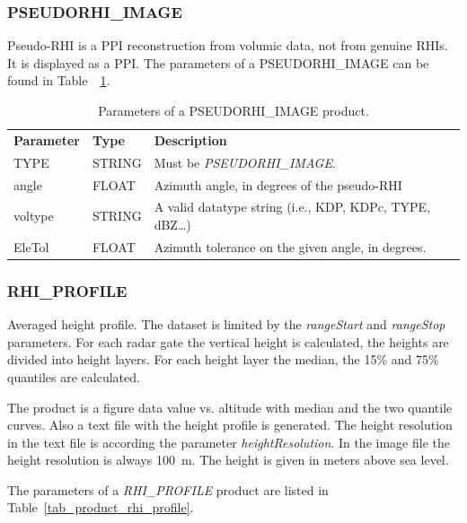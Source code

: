 \documentclass[a4paper,11pt,pdftex,twoside]{scrartcl}
\renewcommand{\bf}{\normalfont \bfseries}
\begin{document}
{{{\subsubsection{PSEUDORHI\_IMAGE}
    \label{subsec_pseudorhi_image}
Pseudo-RHI is a PPI reconstruction from volumic data, not from genuine RHIs.
It is displayed as a PPI. The parameters of a PSEUDORHI\_IMAGE can be found in Table~~\ref{tab_product_pseudorhi_image}.

\begin{table}[H]
 \begin{tabularx}{\textwidth}{llX}
 \bf{Parameter}  & \bf{Type}  & \bf{Description}\\
 TYPE           & STRING     & Must be \emph{PSEUDORHI\_IMAGE}.\\
 angle          & FLOAT      & Azimuth angle, in degrees of the pseudo-RHI \\
 voltype        & STRING     & A valid datatype string (i.e., KDP, KDPc, TYPE, dBZ\dots)\\
 EleTol         & FLOAT      & Azimuth tolerance on the given angle, in degrees. \\
 \end{tabularx}
 \caption{Parameters of a PSEUDORHI\_IMAGE product.}
 \label{tab_product_pseudorhi_image}
\end{table}



 \subsubsection{RHI\_PROFILE}
 \label{subsec_rhi_profile}

Averaged height profile. The dataset is limited by the  \emph{rangeStart} and
 \emph{rangeStop} parameters. For each radar gate the vertical height is calculated,
 the heights are divided into height layers. For each height layer the median, the
 15\% and 75\% quantiles are calculated.

The product is a figure data value vs. altitude with median  and the two
 quantile curves. Also a text file with the height profile is
 generated. The height resolution in the text file is according the parameter
 \emph{heightResolution}. In the image file the height resolution is always
 100~m. The height is given in meters above sea level.

The parameters of a \emph{RHI\_PROFILE} product are listed in Table~\ref{tab_product_rhi_profile}.

}}}
\end{document}
